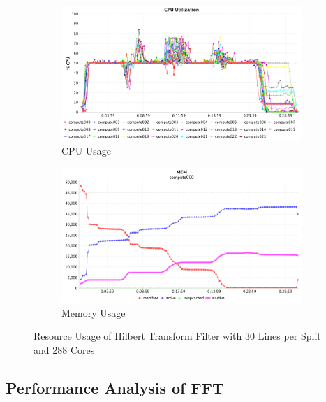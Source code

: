 \begin{figure}[h]
\centering
\begin{subfigure}{1\textwidth}
  \centering
  \includegraphics[width=1\linewidth]{figures/Htf30_288_CPU.png}
  \caption{CPU Usage}
  \label{Htf30_288_CPU}
\end{subfigure}
\begin{subfigure}{1\textwidth}
  \centering
  \includegraphics[width=1\linewidth]{figures/Htf30_288_MEM.png}
  \caption{Memory Usage}
  \label{Htf30_288_MEM}
\end{subfigure}
\caption{Resource Usage of Hilbert Transform Filter with 30 Lines per Split and 288 Cores}
\label{Htf30_288}
\end{figure}


\subsection{Performance Analysis of FFT}

